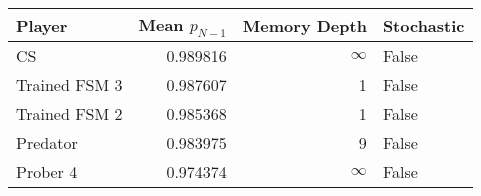 \begin{tabular}{lrrl}
\toprule
        Player &  Mean $p_{N-1}$ &  Memory Depth & Stochastic \\
\midrule
            CS &        0.989816 &            \(\infty\) &      False \\
 Trained FSM 3 &        0.987607 &             1 &      False \\
 Trained FSM 2 &        0.985368 &             1 &      False \\
      Predator &        0.983975 &             9 &      False \\
      Prober 4 &        0.974374 &            \(\infty\) &      False \\
\bottomrule
\end{tabular}
